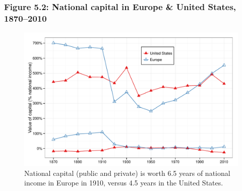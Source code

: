 \documentclass[t]{beamer}\usepackage[]{graphicx}\usepackage[]{color}
\newenvironment{knitrout}{}{} %
\begin{document}
\begin{frame}[label=Figure_5_2]
\frametitle{Figure 5.2: National capital in Europe \& United States, 1870--2010}
\begin{figure}[t]
\begin{minipage}[b]{\textwidth}
\centering
\begin{knitrout}\footnotesize
{}\color{fgcolor}

{\centering \includegraphics[width=1\linewidth]{figures/color/Figure_5_2} 

}



\end{knitrout}
\caption{National capital (public and private) is worth 6.5 years of national income in Europe in 1910, versus 4.5 years in the United States.}
\end{minipage}
\end{figure}
\end{frame}
\end{document}
